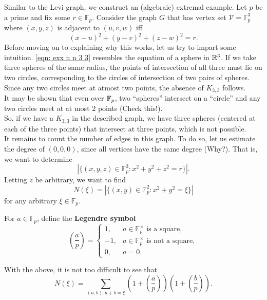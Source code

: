 			Similar to the Levi graph, we construct an (algebraic) extremal example. Let $p$ be a prime and fix some $r\in\mathbb{F}_p$.
			Consider the graph $G$ that has vertex set $\mathcal{V} = \mathbb{F}_p^3$ where $(x,y,z)$ is adjacent to $(u,v,w)$ iff 
			\begin{equation}
				\label{eqn: exx n n 3 3}
				(x-u)^2 + (y-v)^2 + (z-w)^2 = r.
			\end{equation}
			Before moving on to explaining why this works, let us try to impart some intuition. \eqref{eqn: exx n n 3 3} resembles the equation of a sphere in $\mathbb{R}^3$. If we take three spheres of the same radius, the points of intersection of all three must lie on two circles, corresponding to the circles of intersection of two pairs of spheres. Since any two circles meet at atmost two points, the absence of $K_{3,3}$ follows.\\
			It may be shown that even over $\mathbb{F}_p$, two ``spheres'' intersect on a ``circle'' and any two circles meet at at most $2$ points (Check this!).\\
			So, if we have a $K_{3,3}$ in the described graph, we have three spheres (centered at each of the three points) that intersect at three points, which is not possible.\\

			It remains to count the number of edges in this graph. To do so, let us estimate the degree of $(0,0,0)$, since all vertices have the same degree (Why?). That is, we want to determine
			\[ |\{(x,y,z)\in\mathbb{F}_p^3 : x^2 + y^2 + z^2 = r\}|. \]
			Letting $z$ be arbitrary, we want to find
			\[ N(\xi) = |\{(x,y)\in\mathbb{F}_p^2 : x^2 + y^2 = \xi\}| \]
			for any arbitrary $\xi \in \mathbb{F}_p$.

			\begin{fdef}
				For $a \in \mathbb{F}_p$, define the \textbf{Legendre symbol}
				\[
					\left(\frac{a}{p}\right) =
					\begin{cases}
						1, & \text{$a\in\mathbb{F}_p^\times$ is a square}, \\
						-1, & \text{$a\in\mathbb{F}_p^\times$ is not a square}, \\
						0, & a=0.
					\end{cases}
				\]
			\end{fdef}

			With the above, it is not too difficult to see that
			\[ N(\xi) = \sum_{(a,b): a + b = \xi} \left(1 + \left(\frac{a}{p}\right) \right) \left(1 + \left(\frac{b}{p}\right)\right). \]

